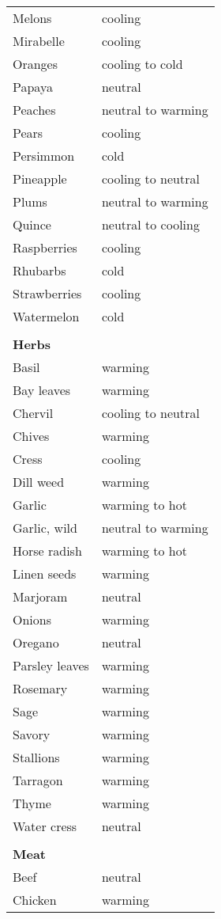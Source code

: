 \documentclass[../main.tex]{subfiles}
\begin{document}
\begin{longtable}{ll}
Melons & cooling  \\
Mirabelle & cooling  \\
Oranges & cooling to cold \\
Papaya & neutral \\
Peaches & neutral to warming \\
Pears & cooling  \\
Persimmon & cold \\
Pineapple & cooling to neutral \\
Plums & neutral to warming \\
Quince & neutral to cooling \\
Raspberries & cooling  \\
Rhubarbs & cold \\
Strawberries & cooling  \\
Watermelon & cold \\
 \\
\multicolumn{2}{l}{\textbf{Herbs}} \\
Basil & warming \\
Bay leaves & warming \\
Chervil & cooling to neutral \\
Chives & warming \\
Cress & cooling   \\
Dill weed & warming \\
Garlic  & warming to hot \\
Garlic, wild & neutral to warming \\
Horse radish & warming to hot \\
Linen seeds & warming \\
Marjoram & neutral  \\
Onions & warming \\
Oregano & neutral  \\
Parsley leaves & warming \\
Rosemary & warming \\
Sage & warming \\
Savory & warming \\
Stallions & warming \\
Tarragon & warming \\
Thyme & warming \\
Water cress & neutral   \\
 \\
\multicolumn{2}{l}{\textbf{Meat}} \\
Beef & neutral  \\
Chicken & warming \\

\end{longtable}
\end{document}

